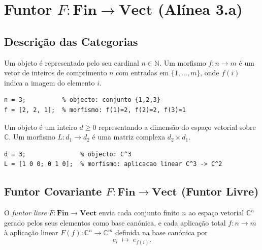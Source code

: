 \section{Funtor $F: \mathbf{Fin} \to \mathbf{Vect}$ (Alínea 3.a)}
\label{sec:functor-fin-vect}

\subsection{Descrição das Categorias}

\begin{definition}
Um objeto é representado pelo seu cardinal $n \in \mathbb{N}$. Um morfismo $f: n \to m$ é um vetor de inteiros de comprimento $n$ com entradas em $\{1,\ldots,m\}$, onde $f(i)$ indica a imagem do elemento $i$.
\end{definition}

\begin{lstlisting}[style=matlab, caption={Objeto e morfismo em $\mathbf{Fin}$}]
n = 3;          % objecto: conjunto {1,2,3}
f = [2, 2, 1];  % morfismo: f(1)=2, f(2)=2, f(3)=1
\end{lstlisting}

\begin{definition}
Um objeto é um inteiro $d \geq 0$ representando a dimensão do espaço vetorial sobre $\mathbb{C}$. Um morfismo $L: d_1 \to d_2$ é uma matriz complexa $d_2 \times d_1$.
\end{definition}

\begin{lstlisting}[style=matlab, caption={Objeto e morfismo em $\mathbf{Vect}$}]
d = 3;               % objecto: C^3
L = [1 0 0; 0 1 0];  % morfismo: aplicacao linear C^3 -> C^2
\end{lstlisting}

\subsection{Funtor Covariante $F: \mathbf{Fin} \to \mathbf{Vect}$ (Funtor Livre)}

O \emph{funtor livre} $F: \mathbf{Fin} \to \mathbf{Vect}$ envia cada conjunto finito $n$ ao espaço vetorial $\mathbb{C}^n$ gerado pelos seus elementos como base canónica, e cada aplicação total $f: n \to m$ à aplicação linear $F(f): \mathbb{C}^n \to \mathbb{C}^m$ definida na base canónica por
\[
    e_i \;\longmapsto\; e_{f(i)}.
\]

